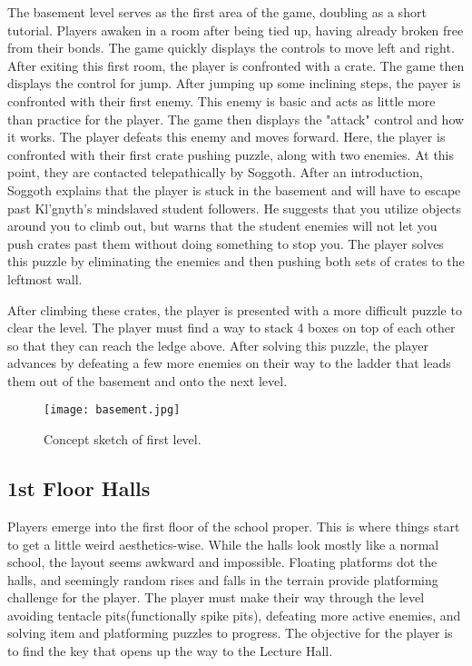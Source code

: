 \documentclass [12pt]{article}
\begin{document}
The basement level serves as the first area of the game, doubling as a short tutorial. Players awaken in a room after being tied up, having already broken free from their bonds. The game quickly displays the controls to move left and right. After exiting this first room, the player is confronted with a crate. The game then displays the control for jump. After jumping up some inclining steps, the payer is confronted with their first enemy. This enemy is basic and acts as little more than practice for the player. The game then displays the "attack" control and how it works. The player defeats this enemy and moves forward. Here, the player is confronted with their first crate pushing puzzle, along with two enemies. At this point, they are contacted telepathically by Soggoth. After an introduction, Soggoth explains that the player is stuck in the basement and will have to escape past Kl'gnyth's mindslaved student followers. He suggests that you utilize objects around you to climb out, but warns that the student enemies will not let you push crates past them without doing something to stop you. The player solves this puzzle by eliminating the enemies and then pushing both sets of crates to the leftmost wall.

After climbing these crates, the player is presented with a more difficult puzzle to clear the level. The player must find a way to stack 4 boxes on top of each other so that they can reach the ledge above. After solving this puzzle, the player advances by defeating a few more enemies on their way to the ladder that leads them out of the basement and onto the next level.

\begin{figure}[!htb]
	\texttt{[image: basement.jpg]}
	\caption{Concept sketch of first level.}
\end{figure}
\newpage

\subsection*{1st Floor Halls}

Players emerge into the first floor of the school proper. This is where things start to get a little weird aesthetics-wise. While the halls look mostly like a normal school, the layout seems awkward and impossible. Floating platforms dot the halls, and seemingly random rises and falls in the terrain provide platforming challenge for the player. The player must make their way through the level avoiding tentacle pits(functionally spike pits), defeating more active enemies, and solving item and platforming puzzles to progress. The objective for the player is to find the key that opens up the way to the Lecture Hall.
\newpage
\end{document}
